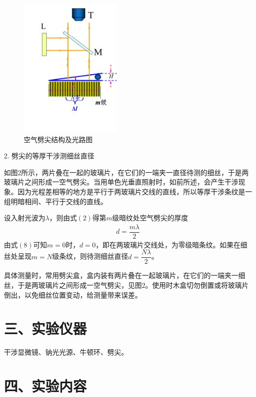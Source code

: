 \documentclass[11pt]{article}
\begin{document}
\begin{figure}
    \centering
    \includegraphics[width=5cm]{Figs/空气劈尖结构及光路图.jpg}
    \caption{\small 空气劈尖结构及光路图}
\end{figure}

2. 劈尖的等厚干涉测细丝直径

如图$2$所示，两片叠在一起的玻璃片，在它们的一端夹一直径待测的细丝，于是两玻璃片之间形成一空气劈尖。当用单色光垂直照射时，如前所述，会产生干涉现象。因为光程差相等的地方是平行于两玻璃片交线的直线，所以等厚干涉条纹是一组明暗相间、平行于交线的直线。

设入射光波为$\lambda$，则由式$(2)$得第$m$级暗纹处空气劈尖的厚度
\begin{align}
    d=\dfrac{m\lambda}{2}
\end{align}
由式$(8)$可知$m=0$时，$d=0$，即在两玻璃片交线处，为零级暗条纹。如果在细丝处呈现$m=N$级条纹，则待测细丝直径$d=\dfrac{N\lambda}{2}$。

具体测量时，常用劈尖盒，盒内装有两片叠在一起玻璃片，在它们的一端夹一细丝，于是两玻璃片之间形成一空气劈尖，见图$2$。使用时木盒切勿倒置或将玻璃片倒出，以免细丝位置变动，给测量带来误差。

\section*{三、实验仪器}

干涉显微镜、钠光光源、牛顿环、劈尖。

\section*{四、实验内容}
\end{document}
